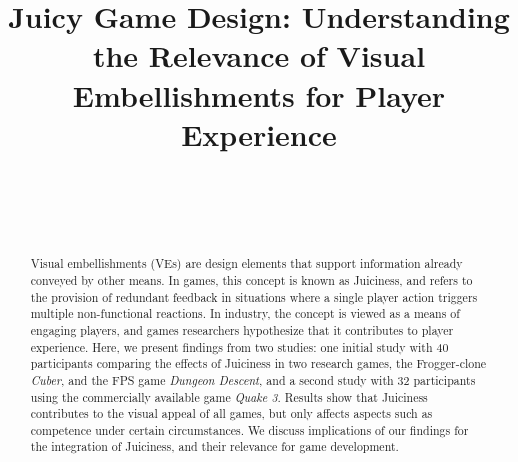 \documentclass{sigchi}
\begin{document}
\title{Juicy Game Design: Understanding the Relevance of Visual Embellishments for Player Experience}

\author{%
  \\
  \\
  \\
}



\maketitle

\begin{abstract}
Visual embellishments (VEs) are design elements that support information already conveyed by other means. In games, this concept is known as Juiciness, and refers to the provision of redundant feedback in situations where a single player action triggers multiple non-functional reactions. In industry, the concept is viewed as a means of engaging players, and games researchers hypothesize that it contributes to player experience. Here, we present findings from two studies: one initial study with 40 participants comparing the effects of Juiciness in two research games, the Frogger-clone \textit{Cuber}, and the FPS game \textit{Dungeon Descent}, and a second study with 32 participants using the commercially available game \textit{Quake 3}. Results show that Juiciness contributes to the visual appeal of all games, but only affects aspects such as competence under certain circumstances. We discuss implications of our findings for the integration of Juiciness, and their relevance for game development.
\end{abstract}
\end{document}
